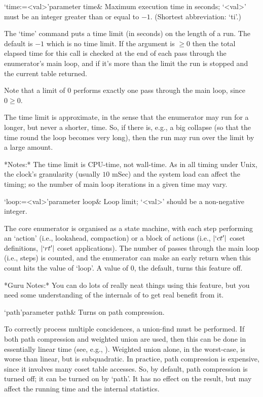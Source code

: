 \>`time:=<val>'{parameter time}&
Maximum execution time in seconds; `<val>' must be an integer greater
than or equal to $-1$. (Shortest abbreviation: `ti'.)

The `time' command  puts a time limit (in seconds) on  the length of a
run. The default is $-1$  which is no  time limit. If the  argument is
$\ge0$ then the total elapsed time for this call is checked at the end
of each pass through the enumerator's main loop, and if it's more than
the limit the run is stopped and the current table returned.

Note that a limit of $0$ performs exactly one pass through the main
loop, since $0 \ge 0$.

%
%
%

The time  limit is approximate, in  the sense that  the enumerator may
run for a longer, but never a shorter, time.  So, if there is, e.g., a
big collapse (so that the time round the loop becomes very long), then
the run may run over the limit by a large amount.

*Notes:*
The time  limit is  CPU-time, not wall-time.   As in all  timing under
Unix, the clock's granularity (usually  $10$ mSec) and the system load
can affect  the timing;  so the  number of main  loop iterations  in a
given time may vary.

\>`loop:=<val>'{parameter loop}&
Loop limit; `<val>' should be a non-negative integer.

The core enumerator is organised as a state machine, with each step
performing an \lq action' (i.e., lookahead, compaction) or a block of
actions (i.e., $|`ct'|$ coset definitions, $|`rt'|$ coset applications).
The number of passes through the main loop (i.e., steps) is counted, and
the enumerator can make an early return when this count hits the
value of `loop'.
A value of $0$, the default, turns this feature off.

*Guru Notes:*
You can do lots of really neat things using this feature, but you need
some understanding of the internals of {\ACE} to get real benefit from
it.

\>`path'{parameter path}&
Turns on path compression.

To  correctly  process  multiple  concidences, a  union-find  must  be
performed.  If both path compression and weighted union are used, then
this can be  done in essentially linear time  (see, e.g., \cite{CLR}).
Weighted union alone, in the  worst-case, is worse than linear, but is
subquadratic.  In  practice, path  compression is expensive,  since it
involves many coset table  accesses.  So, by default, path compression
is turned off; it can be turned on by `path'.  It has no effect on the
result, but may affect the running time and the internal statistics.

